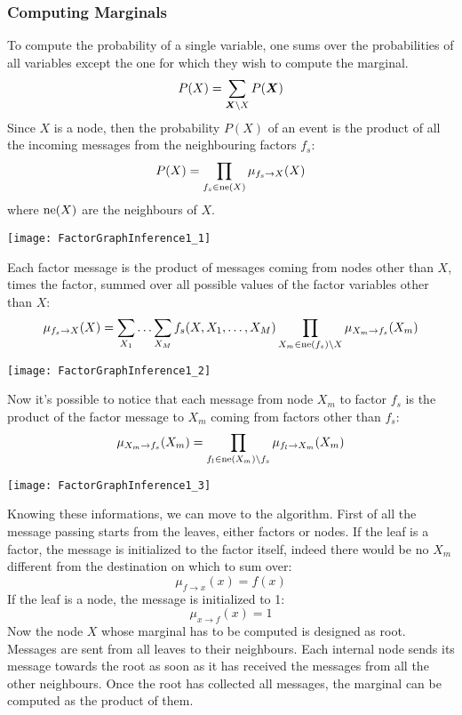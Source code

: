 \subsubsection{Computing Marginals}
To compute the probability of a single variable, one sums over the probabilities of all variables except the one for which they wish to compute the marginal. \newline
\[P(X)=\displaystyle\sum_{\bm{X}\setminus X}P(\bm{X})\]
Since $X$ is a node, then the probability $P(X)$ of an event is the product of all the incoming messages from the neighbouring factors $f_s$:
\[P(X)=\displaystyle\prod_{f_s\in \text{ne}(X)}\mu_{f_s\rightarrow X}(X)\]
where $\text{ne}(X)$ are the neighbours of $X$.
\begin{center}
  \texttt{[image: FactorGraphInference1\_1]}
\end{center}
Each factor message is the product of messages coming from nodes other than $X$, times the factor, summed over all possible values of the factor variables other than $X$:
\[\mu_{f_s\rightarrow X}(X)=\displaystyle\sum_{X_1}\hdots\displaystyle\sum_{X_M} f_s(X,X_1,\hdots,X_M)\displaystyle\prod_{X_m\in\text{ne}(f_s)\setminus X}\mu_{X_m\rightarrow f_s}(X_m)\]
\begin{center}
  \texttt{[image: FactorGraphInference1\_2]}
\end{center}
Now it's possible to notice that each message from node $X_m$ to factor $f_s$ is the product of the factor message to $X_m$ coming from factors other than $f_s$:
\[\mu_{X_m\rightarrow f_s}(X_m)=\displaystyle\prod_{f_l\in\text{ne}(X_m)\setminus f_s}\mu_{f_l\rightarrow X_m}(X_m)\]
\begin{center}
  \texttt{[image: FactorGraphInference1\_3]}
\end{center}
Knowing these informations, we can move to the algorithm. First of all the message passing starts from the leaves, either factors or nodes. \newline
If the leaf is a factor, the message is initialized to the factor itself, indeed there would be no $X_m$ different from the destination on which to sum over:
\[\mu_{f\rightarrow x}(x)=f(x)\]
If the leaf is a node, the message is initialized to 1:
\[\mu_{x\rightarrow f}(x)=1\]
Now the node $X$ whose marginal has to be computed is designed as root. Messages are sent from all leaves to their neighbours. Each internal node sends its message towards the root as soon as it has received the messages from all the other neighbours. Once the root has collected all messages, the marginal can be computed as the product of them. 
